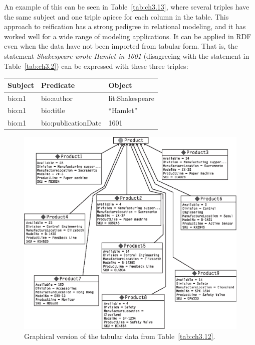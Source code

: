 An example of this can be seen in Table~\ref{tab:ch3.13}, where several triples have
the same subject and one triple apiece for each column in the table.
This approach to reification has a strong pedigree in relational
modeling, and it has worked well for a wide range of modeling
applications. It can be applied in RDF even when the data have not been
imported from tabular form. That is, the statement \emph{Shakespeare
wrote Hamlet in 1601} (disagreeing with the statement in Table~\ref{tab:ch3.2}) can
be expressed with these three triples:

\begin{tabular}{|l l l |}
\hline
Subject&Predicate&Object\\
\hline
bio:n1&bio:author&lit:Shakespeare \\
bio:n1&bio:title&``Hamlet''\\
bio:n1&bio:publicationDate&1601\\
\hline
\end{tabular}

\begin{figure}
    \centering
    \includegraphics[width=5.0in]{media/ch3/f03-07-9780123859655.eps}
    \caption{Graphical version of the tabular data from Table~\ref{tab:ch3.12}.}
    \label{fig:ch3.7}
\end{figure}


